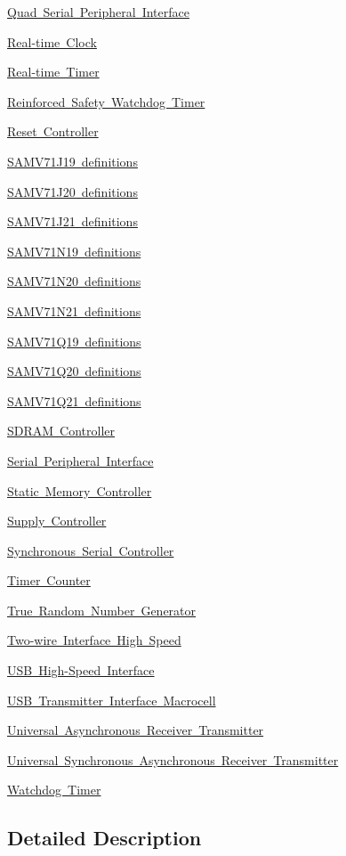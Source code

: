 \begin{DoxyCompactItemize}
\item 
\mbox{\hyperlink{group__SAMV71__QSPI}{Quad Serial Peripheral Interface}}
\item 
\mbox{\hyperlink{group__SAMV71__RTC}{Real-\/time Clock}}
\item 
\mbox{\hyperlink{group__SAMV71__RTT}{Real-\/time Timer}}
\item 
\mbox{\hyperlink{group__SAMV71__RSWDT}{Reinforced Safety Watchdog Timer}}
\item 
\mbox{\hyperlink{group__SAMV71__RSTC}{Reset Controller}}
\item 
\mbox{\hyperlink{group__SAMV71J19__definitions}{S\+A\+M\+V71\+J19 definitions}}
\item 
\mbox{\hyperlink{group__SAMV71J20__definitions}{S\+A\+M\+V71\+J20 definitions}}
\item 
\mbox{\hyperlink{group__SAMV71J21__definitions}{S\+A\+M\+V71\+J21 definitions}}
\item 
\mbox{\hyperlink{group__SAMV71N19__definitions}{S\+A\+M\+V71\+N19 definitions}}
\item 
\mbox{\hyperlink{group__SAMV71N20__definitions}{S\+A\+M\+V71\+N20 definitions}}
\item 
\mbox{\hyperlink{group__SAMV71N21__definitions}{S\+A\+M\+V71\+N21 definitions}}
\item 
\mbox{\hyperlink{group__SAMV71Q19__definitions}{S\+A\+M\+V71\+Q19 definitions}}
\item 
\mbox{\hyperlink{group__SAMV71Q20__definitions}{S\+A\+M\+V71\+Q20 definitions}}
\item 
\mbox{\hyperlink{group__SAMV71Q21__definitions}{S\+A\+M\+V71\+Q21 definitions}}
\item 
\mbox{\hyperlink{group__SAMV71__SDRAMC}{S\+D\+R\+A\+M Controller}}
\item 
\mbox{\hyperlink{group__SAMV71__SPI}{Serial Peripheral Interface}}
\item 
\mbox{\hyperlink{group__SAMV71__SMC}{Static Memory Controller}}
\item 
\mbox{\hyperlink{group__SAMV71__SUPC}{Supply Controller}}
\item 
\mbox{\hyperlink{group__SAMV71__SSC}{Synchronous Serial Controller}}
\item 
\mbox{\hyperlink{group__SAMV71__TC}{Timer Counter}}
\item 
\mbox{\hyperlink{group__SAMV71__TRNG}{True Random Number Generator}}
\item 
\mbox{\hyperlink{group__SAMV71__TWIHS}{Two-\/wire Interface High Speed}}
\item 
\mbox{\hyperlink{group__SAMV71__USBHS}{U\+S\+B High-\/\+Speed Interface}}
\item 
\mbox{\hyperlink{group__SAMV71__UTMI}{U\+S\+B Transmitter Interface Macrocell}}
\item 
\mbox{\hyperlink{group__SAMV71__UART}{Universal Asynchronous Receiver Transmitter}}
\item 
\mbox{\hyperlink{group__SAMV71__USART}{Universal Synchronous Asynchronous Receiver Transmitter}}
\item 
\mbox{\hyperlink{group__SAMV71__WDT}{Watchdog Timer}}
\end{DoxyCompactItemize}


\subsection{Detailed Description}
